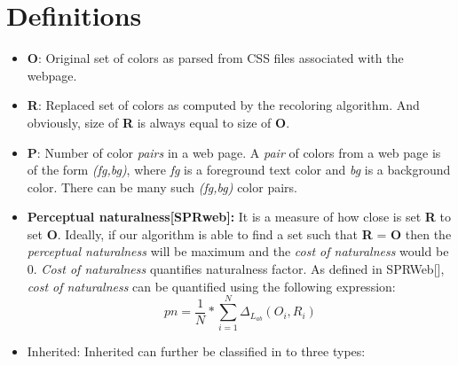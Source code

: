 \section{Definitions}
\label{Related Work}
\begin{itemize}
\item{\textbf{O}: } Original set of colors as parsed from CSS files associated with the webpage.
\item{\textbf{R}: } Replaced set of colors as computed by the recoloring algorithm. And obviously, size of \textbf{R} is always equal to size of \textbf{O}.
\item{\textbf{P}: } Number of color \textit{pairs} in a web page. A \textit{pair} of colors from a web page is of the form \textit{(fg,bg)}, where \textit{fg} is a foreground text color and \textit{bg} is a background color. There can be many such \textit{(fg,bg)} color pairs. 
\item{\textbf{Perceptual naturalness[SPRweb]: }} It is a measure of how close is set \textbf{R} to set \textbf{O}. Ideally, if our algorithm is able to find a set such that \textbf{R} = \textbf{O} then the \textit{perceptual naturalness} will be maximum and the \textit{cost of naturalness} would be 0. \textit{Cost of naturalness} quantifies naturalness factor. As defined in SPRWeb[], \textit{cost of naturalness} can be quantified using the following expression:
\[ pn = \frac{1}{N}*\sum_{i=1}^{N} \Delta_{L_{ab}}(O_{i},R_{i})\]

\item{Inherited:} Inherited can further be classified in to three types:
\end{itemize}
